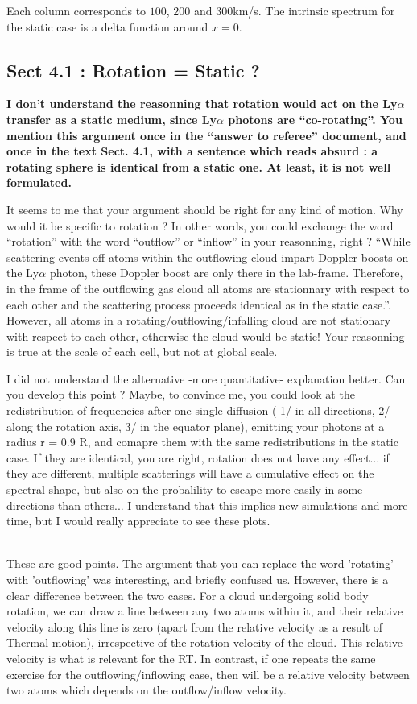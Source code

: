 \documentclass[12pt]{article}
\begin{document}
Each column corresponds to $100$, $200$ and $300$km/s. The intrinsic
spectrum for the static case is a delta function around $x=0$.

\subsection*{Sect 4.1 : Rotation = Static ?}

{\bf I don’t understand the reasonning that rotation would act on the
  Ly$\alpha$ transfer as a static medium, since Ly$\alpha$ photons are
  “co-rotating”. You mention this argument once in the “answer to
  referee” document, and once in the text Sect. 4.1, with a sentence
  which reads absurd : a rotating sphere is identical from a static
  one. At least, it is not well formulated.

It seems to me that your argument should be right for any kind of
motion. Why would it be specific to rotation ? In other words, you
could exchange the word “rotation” with the word “outflow” or “inflow”
in your reasonning, right ? “While scattering events off atoms within
the outflowing cloud impart Doppler boosts on the Ly$\alpha$ photon,
these Doppler boost are only there in the lab-frame. Therefore, in the
frame of the outflowing gas cloud all atoms are stationnary with
respect to each other and the scattering process proceeds identical as
in the static case.”. However, all atoms in a
rotating/outflowing/infalling cloud are not stationary with respect to
each other, otherwise the cloud would be static! Your reasonning is
true at the scale of each cell, but not at global scale. 

I did not understand the alternative -more quantitative- explanation better.
Can you develop this point ? Maybe, to convince me, you could look at
the redistribution of frequencies after one single diffusion ( 1/ in
all directions, 2/ along the rotation axis, 3/ in the equator plane),
emitting your photons at a radius r = 0.9 R, and comapre them with the
same redistributions in the static case. If they are identical, you
are right, rotation does not have any effect... if they are different,
multiple scatterings will have a cumulative effect on the spectral
shape, but also on the probalility to escape more easily in some
directions than others... I understand that this implies new
simulations and more time, but I would really appreciate to see these
plots. } \\ 

These are good points. The argument that you can replace the word
'rotating' with 'outflowing' was interesting, and briefly confused
us. However, there is a clear difference between the two cases. For a
cloud undergoing solid body rotation, we can draw a line between any
two atoms within it, and their relative velocity along this line is
zero (apart from the relative velocity as a result of Thermal motion),
irrespective of the rotation velocity of the cloud. This relative
velocity is what is relevant for the RT. In contrast, if one repeats
the same exercise for the outflowing/inflowing case, then will be a
relative velocity between two atoms which depends on the
outflow/inflow velocity.\\ 
\end{document}
